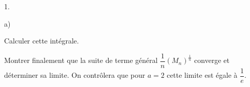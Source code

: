 \documentclass[11pt]{article}%
\begin{document}
\begin{noliste}{1.}
\begin{noliste}{a)}
\item Calculer cette intégrale.

\item Montrer finalement que la suite de terme général
$\dfrac{1}{n}(M_{n})^{\frac{1}{n}}$ converge et déterminer sa limite.
On contrôlera que pour $a = 2$
cette limite est égale à $\dfrac{1}{e}$.
\end{noliste}
\end{noliste}

\label{fin}
\end{document}
